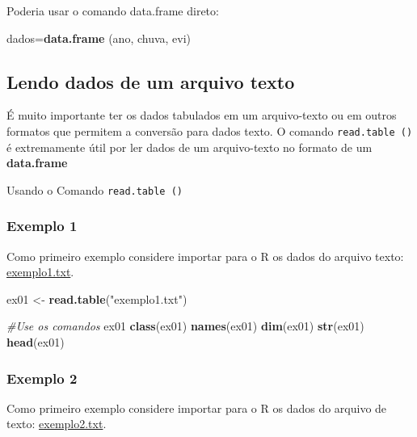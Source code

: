 \documentclass[
]{book}
\newenvironment{Shaded}{\begin{snugshade}}{\end{snugshade}}
\newcommand{\CommentTok}[1]{\textcolor[rgb]{0.56,0.35,0.01}{\textit{#1}}}
\newcommand{\KeywordTok}[1]{\textcolor[rgb]{0.13,0.29,0.53}{\textbf{#1}}}
\newcommand{\NormalTok}[1]{#1}
\newcommand{\StringTok}[1]{\textcolor[rgb]{0.31,0.60,0.02}{#1}}
\begin{document}
Poderia usar o comando data.frame direto:

\begin{Shaded}
\begin{Highlighting}[]
\NormalTok{dados=}\KeywordTok{data.frame}\NormalTok{ (ano, chuva, evi)}
\end{Highlighting}
\end{Shaded}

\hypertarget{lendo-dados-de-um-arquivo-texto}{%
\subsection{Lendo dados de um arquivo texto}\label{lendo-dados-de-um-arquivo-texto}}

É muito importante ter os dados tabulados em um arquivo-texto ou em outros formatos que permitem a conversão para dados texto. O comando \texttt{read.table\ ()} é extremamente útil por ler dados de um arquivo-texto no formato de um \textbf{data.frame}

Usando o Comando \texttt{read.table\ ()}

\hypertarget{exemplo-1-1}{%
\subsubsection{Exemplo 1}\label{exemplo-1-1}}

Como primeiro exemplo considere importar para o R os dados do arquivo texto: \href{https://www.dropbox.com/s/m7jivbbggei5y0x/exemplo1.txt?dl=1}{exemplo1.txt}.

\begin{Shaded}
\begin{Highlighting}[]
\NormalTok{ex01 <-}\StringTok{ }\KeywordTok{read.table}\NormalTok{(}\StringTok{"exemplo1.txt"}\NormalTok{) }

\CommentTok{#Use os comandos}
\NormalTok{  ex01}
  \KeywordTok{class}\NormalTok{(ex01)}
  \KeywordTok{names}\NormalTok{(ex01)}
  \KeywordTok{dim}\NormalTok{(ex01)}
  \KeywordTok{str}\NormalTok{(ex01)}
  \KeywordTok{head}\NormalTok{(ex01)}
\end{Highlighting}
\end{Shaded}

\hypertarget{exemplo-2-1}{%
\subsubsection{Exemplo 2}\label{exemplo-2-1}}

Como primeiro exemplo considere importar para o R os dados do arquivo de texto: \href{https://www.dropbox.com/s/bi4b0j2nnnetc1r/exemplo2.txt?dl=1}{exemplo2.txt}.
\end{document}

